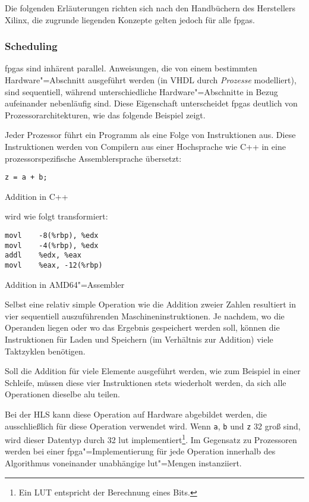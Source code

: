 Die folgenden Erläuterungen richten sich nach den Handbüchern des Herstellers
Xilinx, die zugrunde liegenden Konzepte gelten jedoch für alle \gls{fpga}s.

\subsubsection{Scheduling}

\gls{fpga}s sind inhärent parallel. Anweisungen, die von einem bestimmten
Hardware"=Abschnitt ausgeführt werden (in VHDL durch \textit{Prozesse}
modelliert), sind sequentiell, während unterschiedliche Hardware"=Abschnitte in
Bezug aufeinander nebenläufig sind. Diese Eigenschaft unterscheidet \gls{fpga}s
deutlich von Prozessorarchitekturen, wie das folgende Beispiel zeigt.

Jeder Prozessor führt ein Programm als eine Folge von Instruktionen aus. Diese
Instruktionen werden von Compilern aus einer Hochsprache wie C++ in eine
prozessorspezifische Assemblersprache übersetzt:
\begin{code}
    \begin{verbatim}
z = a + b;
    \end{verbatim}
    \caption{Addition in C++}
\end{code}
wird wie folgt transformiert:
\begin{code}
    \begin{verbatim}
movl    -8(%rbp), %edx
movl    -4(%rbp), %edx
addl    %edx, %eax
movl    %eax, -12(%rbp)
    \end{verbatim}
    \caption{Addition in AMD64"=Assembler}
\end{code}
Selbst eine relativ simple Operation wie die Addition zweier Zahlen resultiert
in vier sequentiell auszuführenden Maschineninstruktionen. Je nachdem, wo die
Operanden liegen oder wo das Ergebnis gespeichert werden soll, können die
Instruktionen für Laden und Speichern (im Verhältnis zur Addition) viele
Taktzyklen benötigen. \cite[vgl.][18]{hlsintro2019}

Soll die Addition für viele Elemente ausgeführt werden, wie zum Beispiel in
einer Schleife, müssen diese vier Instruktionen stets wiederholt werden, da sich
alle Operationen dieselbe \gls{alu} teilen.

Bei der HLS kann diese Operation auf Hardware abgebildet werden, die
ausschließlich für diese Operation verwendet wird. Wenn \texttt{a}, \texttt{b}
und \texttt{z} \SI{32}{\bit} groß sind, wird dieser Datentyp durch 32 \gls{lut}
implementiert\footnote{Ein LUT entspricht der Berechnung eines Bits.}. Im
Gegensatz zu Prozessoren werden bei einer \gls{fpga}"=Implementierung für jede
Operation innerhalb des Algorithmus voneinander unabhängige \gls{lut}"=Mengen
instanziiert.
\cite[vgl.][19]{hlsintro2019}

